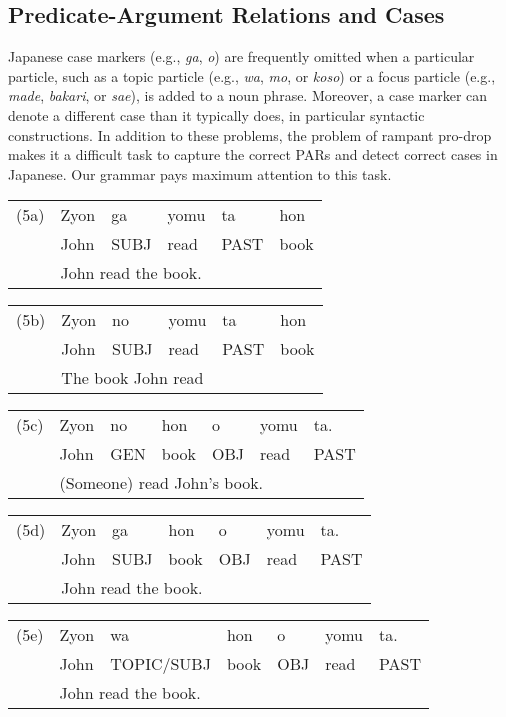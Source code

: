 \documentclass[english]{jnlp_1.4_rep}
\begin{document}
\subsection{Predicate-Argument Relations and Cases}
\label{PAR}

Japanese case markers (e.g., \textit{ga}, \textit{o}) are frequently
omitted when a particular particle, such as a topic particle
(e.g., \textit{wa}, \textit{mo}, or \textit{koso}) or a focus particle
(e.g., \textit{made}, \textit{bakari}, or \textit{sae}), is added to a
noun phrase.  Moreover, a case marker can denote a different case than
it typically does, in particular syntactic constructions.  In addition
to these problems, the problem of rampant pro-drop makes it a
difficult task to capture the correct PARs and detect correct
cases in Japanese.  Our grammar pays maximum attention to this task.

\vspace{2pt}
\noindent
\begin{tabular}{ll@{ }l@{ }l@{ }l@{ }l}
(5a) & Zyon&ga&yomu&ta&hon\\
     & John&SUBJ&read&PAST&book\\
     & \multicolumn{5}{l}{\quad John read the book.}
\end{tabular}

\noindent
\begin{tabular}{ll@{ }l@{ }l@{ }l@{ }l}
(5b) & Zyon&no&yomu&ta&hon\\
     & John&SUBJ&read&PAST&book\\
     & \multicolumn{5}{l}{\quad The book John read}
\end{tabular}

\noindent
\begin{tabular}{ll@{ }l@{ }l@{ }l@{ }l@{ }l}
(5c) & Zyon&no&hon&o&yomu&ta.\\
     & John&GEN&book&OBJ&read&PAST \\
     & \multicolumn{6}{l}{\quad (Someone) read John's book.}
\end{tabular}

\noindent
\begin{tabular}{ll@{ }l@{ }l@{ }l@{ }l@{ }l}
(5d) & Zyon&ga&hon&o&yomu&ta.\\
     & John &SUBJ&book&OBJ&read&PAST\\
     & \multicolumn{6}{l}{\quad John read the book.}
\end{tabular}

\noindent
\begin{tabular}{ll@{ }l@{ }l@{ }l@{ }l@{ }l}
(5e) & Zyon&wa&hon&o&yomu&ta.\\
     & John&TOPIC/SUBJ&book&OBJ&read&PAST \\
     & \multicolumn{6}{l}{\quad John read the book.}
\end{tabular}
\end{document}
